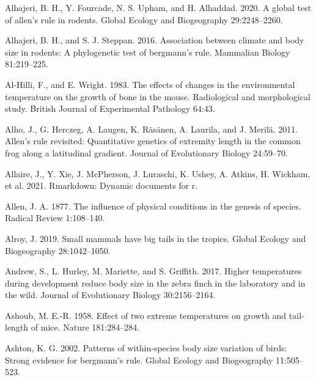 \documentclass[]{article}
\begin{document}
\setlength{\parindent}{-0.25in}
\setlength{\leftskip}{0.25in}

\noindent

\hypertarget{refs}{}
\leavevmode\hypertarget{ref-Alhajeri2020}{}%
Alhajeri, B. H., Y. Fourcade, N. S. Upham, and H. Alhaddad. 2020. A
global test of allen's rule in rodents. Global Ecology and Biogeography
29:2248--2260.

\leavevmode\hypertarget{ref-Alhajeri2016}{}%
Alhajeri, B. H., and S. J. Steppan. 2016. Association between climate
and body size in rodents: A phylogenetic test of bergmann's rule.
Mammalian Biology 81:219--225.

\leavevmode\hypertarget{ref-Al-Hilli1983}{}%
Al-Hilli, F., and E. Wright. 1983. The effects of changes in the
environmental temperature on the growth of bone in the mouse.
Radiological and morphological study. British Journal of Experimental
Pathology 64:43.

\leavevmode\hypertarget{ref-Alho2011}{}%
Alho, J., G. Herczeg, A. Laugen, K. Räsänen, A. Laurila, and J. Merilä.
2011. Allen's rule revisited: Quantitative genetics of extremity length
in the common frog along a latitudinal gradient. Journal of Evolutionary
Biology 24:59--70.

\leavevmode\hypertarget{ref-Allaire2021}{}%
Allaire, J., Y. Xie, J. McPherson, J. Luraschi, K. Ushey, A. Atkins, H.
Wickham, et al. 2021. Rmarkdown: Dynamic documents for r.

\leavevmode\hypertarget{ref-Allen1877}{}%
Allen, J. A. 1877. The influence of physical conditions in the genesis
of species. Radical Review 1:108--140.

\leavevmode\hypertarget{ref-Alroy2019}{}%
Alroy, J. 2019. Small mammals have big tails in the tropics. Global
Ecology and Biogeography 28:1042--1050.

\leavevmode\hypertarget{ref-Andrew2017}{}%
Andrew, S., L. Hurley, M. Mariette, and S. Griffith. 2017. Higher
temperatures during development reduce body size in the zebra finch in
the laboratory and in the wild. Journal of Evolutionary Biology
30:2156--2164.

\leavevmode\hypertarget{ref-Ashoub1958}{}%
Ashoub, M. E.-R. 1958. Effect of two extreme temperatures on growth and
tail-length of mice. Nature 181:284--284.

\leavevmode\hypertarget{ref-Ashton2002}{}%
Ashton, K. G. 2002. Patterns of within-species body size variation of
birds: Strong evidence for bergmann's rule. Global Ecology and
Biogeography 11:505--523.
\end{document}
